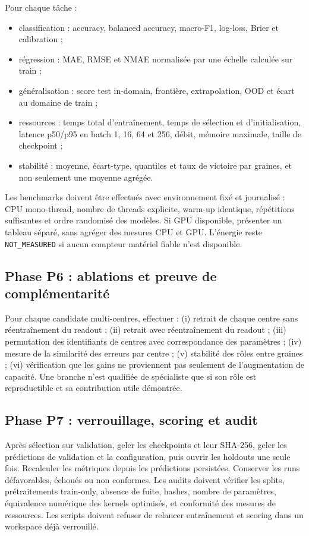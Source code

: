 \documentclass[11pt,a4paper]{article}
\newcommand{\code}[1]{\texttt{\small #1}}
\begin{document}
Pour chaque tâche :
\begin{itemize}
  \item classification : accuracy, balanced accuracy, macro-F1, log-loss, Brier et calibration ;
  \item régression : MAE, RMSE et NMAE normalisée par une échelle calculée sur train ;
  \item généralisation : score test in-domain, frontière, extrapolation, OOD et écart au domaine de train ;
  \item ressources : temps total d'entraînement, temps de sélection et d'initialisation, latence p50/p95 en batch 1, 16, 64 et 256, débit, mémoire maximale, taille de checkpoint ;
  \item stabilité : moyenne, écart-type, quantiles et taux de victoire par graines, et non seulement une moyenne agrégée.
\end{itemize}

Les benchmarks doivent être effectués avec environnement fixé et journalisé : CPU mono-thread, nombre de threads explicite, warm-up identique, répétitions suffisantes et ordre randomisé des modèles. Si GPU disponible, présenter un tableau séparé, sans agréger des mesures CPU et GPU. L'énergie reste \code{NOT\_MEASURED} si aucun compteur matériel fiable n'est disponible.

\subsection{Phase P6 : ablations et preuve de complémentarité}

Pour chaque candidate multi-centres, effectuer : (i) retrait de chaque centre sans réentraînement du readout ; (ii) retrait avec réentraînement du readout ; (iii) permutation des identifiants de centres avec correspondance des paramètres ; (iv) mesure de la similarité des erreurs par centre ; (v) stabilité des rôles entre graines ; (vi) vérification que les gains ne proviennent pas seulement de l'augmentation de capacité. Une branche n'est qualifiée de spécialiste que si son rôle est reproductible et sa contribution utile démontrée.

\subsection{Phase P7 : verrouillage, scoring et audit}

Après sélection sur validation, geler les checkpoints et leur SHA-256, geler les prédictions de validation et la configuration, puis ouvrir les holdouts une seule fois. Recalculer les métriques depuis les prédictions persistées. Conserver les runs défavorables, échoués ou non conformes. Les audits doivent vérifier les splits, prétraitements train-only, absence de fuite, hashes, nombre de paramètres, équivalence numérique des kernels optimisés, et conformité des mesures de ressources. Les scripts doivent refuser de relancer entraînement et scoring dans un workspace déjà verrouillé.
\end{document}
